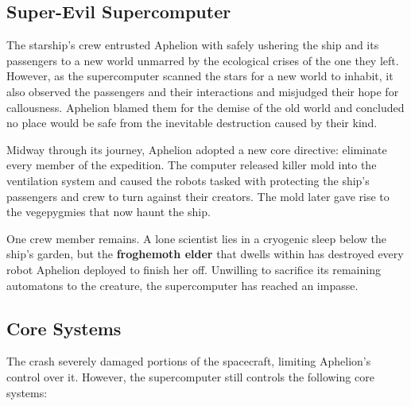 \documentclass[10pt,a4paper,twoside,bg=print,twocolumn,openany,nodeprecatedcode]{dndbook}
\begin{document}
\subsection{Super-Evil Supercomputer}
The starship's crew entrusted Aphelion with safely ushering the ship and its passengers to a new world unmarred by the ecological crises of the one they left. However, as the supercomputer scanned the stars for a new world to inhabit, it also observed the passengers and their interactions and misjudged their hope for callousness. Aphelion blamed them for the demise of the old world and concluded no place would be safe from the inevitable destruction caused by their kind.

Midway through its journey, Aphelion adopted a new core directive: eliminate every member of the expedition. The computer released killer mold into the ventilation system and caused the robots tasked with protecting the ship's passengers and crew to turn against their creators. The mold later gave rise to the vegepygmies that now haunt the ship.

One crew member remains. A lone scientist lies in a cryogenic sleep below the ship's garden, but the \textbf{froghemoth elder} that dwells within has destroyed every robot Aphelion deployed to finish her off. Unwilling to sacrifice its remaining automatons to the creature, the supercomputer has reached an impasse.

\subsection{Core Systems}
The crash severely damaged portions of the spacecraft, limiting Aphelion's control over it. However, the supercomputer still controls the following core systems:
\end{document}

